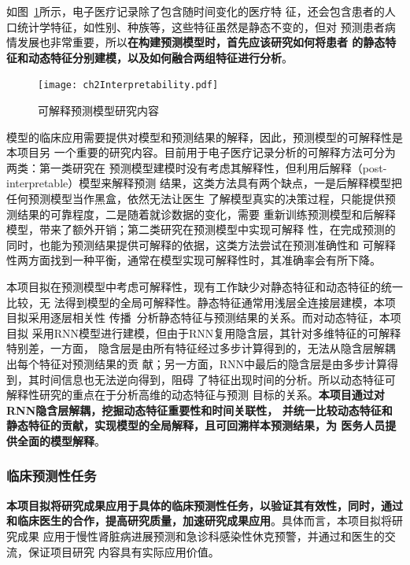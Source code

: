 如图~\ref{fig:ch2:interpretability}所示，电子医疗记录除了包含随时间变化的医疗特
征，还会包含患者的人口统计学特征，如性别、种族等，这些特征虽然是静态不变的，但对
预测患者病情发展也非常重要，所以\textbf{在构建预测模型时，首先应该研究如何将患者
的静态特征和动态特征分别建模，以及如何融合两组特征进行分析}。

\begin{figure}
    \begin{small}
        \begin{center}
            \texttt{[image: ch2Interpretability.pdf]}
        \end{center}
        \caption{可解释预测模型研究内容}
        \label{fig:ch2:interpretability}
    \end{small}
\end{figure}

模型的临床应用需要提供对模型和预测结果的解释，因此，预测模型的可解释性是本项目另
一个重要的研究内容。目前用于电子医疗记录分析的可解释方法可分为两类：第一类研究在
预测模型建模时没有考虑其解释性，但利用后解释（post-interpretable）模型来解释预测
结果，这类方法具有两个缺点，一是后解释模型把任何预测模型当作黑盒，依然无法让医生
了解模型真实的决策过程，只能提供预测结果的可靠程度，二是随着就诊数据的变化，需要
重新训练预测模型和后解释模型，带来了额外开销；第二类研究在预测模型中实现可解释
性，在完成预测的同时，也能为预测结果提供可解释的依据，这类方法尝试在预测准确性和
可解释性两方面找到一种平衡，通常在模型实现可解释性时，其准确率会有所下降。

本项目拟在预测模型中考虑可解释性，现有工作缺少对静态特征和动态特征的统一比较，无
法得到模型的全局可解释性。静态特征通常用浅层全连接层建模，本项目拟采用逐层相关性
传播~分析静态特征与预测结果的关系。而对动态特征，本项目拟
采用RNN模型进行建模，但由于RNN复用隐含层，其针对多维特征的可解释特别差，一方面，
隐含层是由所有特征经过多步计算得到的，无法从隐含层解耦出每个特征对预测结果的贡
献；另一方面，RNN中最后的隐含层是由多步计算得到，其时间信息也无法逆向得到，阻碍
了特征出现时间的分析。所以动态特征可解释性研究的重点在于分析高维的动态特征与预测
目标的关系。\textbf{本项目通过对RNN隐含层解耦，挖掘动态特征重要性和时间关联性，
并统一比较动态特征和静态特征的贡献，实现模型的全局解释，且可回溯样本预测结果，为
医务人员提供全面的模型解释}。

\subsubsection{临床预测性任务}

\textbf{本项目拟将研究成果应用于具体的临床预测性任务，以验证其有效性，同时，通过
和临床医生的合作，提高研究质量，加速研究成果应用}。具体而言，本项目拟将研究成果
应用于慢性肾脏病进展预测和急诊科感染性休克预警，并通过和医生的交流，保证项目研究
内容具有实际应用价值。

